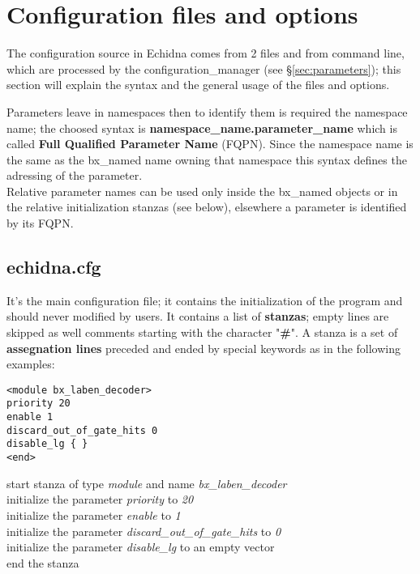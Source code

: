 \section{Configuration files and options}
\label{sec:conffile}
The configuration source in Echidna comes from 2 files and from command line, which are processed by the 
configuration\_manager (see \S\ref{sec:parameters}); this section will explain the syntax and the general 
usage of the files and options. 

Parameters leave in namespaces then to identify them is required the namespace name; the choosed syntax is
{\bf namespace\_name.parameter\_name} which is called {\bf Full Qualified Parameter Name} (FQPN).
Since the namespace name is the same as the bx\_named name owning that namespace this syntax
defines the  adressing of the parameter.\\
Relative parameter names can be used only inside the bx\_named objects or in the relative initialization
stanzas (see below), elsewhere a parameter is identified by its FQPN.

\subsection{echidna.cfg}
\label{sec:conf_ech_cfg}
It's the main configuration file; it contains the initialization of the program and should never modified 
by users. It contains a list of {\bf stanzas}; empty lines are skipped as well comments starting with the 
character "{\bf \#}".
A stanza is a set of {\bf assegnation lines} preceded and ended by special keywords as in the following examples:
\vskip 2mm
\begin{minipage}{5cm}
\begin{verbatim}
<module bx_laben_decoder>
priority 20
enable 1
discard_out_of_gate_hits 0
disable_lg { }
<end>
\end{verbatim}
\end{minipage}
\begin{minipage}{\textwidth}
start stanza of type {\it module} and name {\it bx\_laben\_decoder}\\
initialize the parameter {\it priority} to {\it 20}\\
initialize the parameter {\it enable} to {\it 1}\\
initialize the parameter {\it discard\_out\_of\_gate\_hits} to {\it 0}\\
initialize the parameter {\it disable\_lg} to an empty vector\\
end the stanza
\end{minipage}
\vskip 2mm

